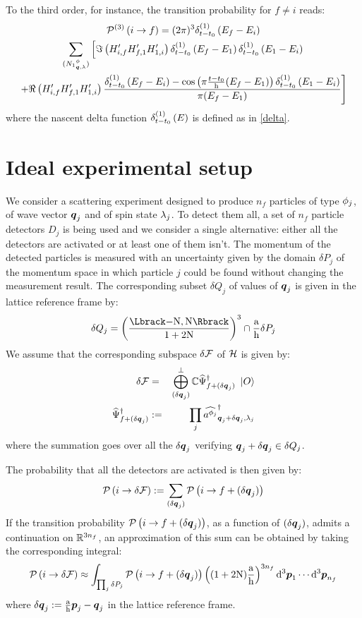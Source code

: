 \documentclass[10pt,a4paper,twoside,openany]{book}
\begin{document}
To the third order, for instance, the transition probability for $f \neq i$ reads:
\begin{multline*}
\TPn i f 3 = ( 2 \pi )^3 \deltaE1{E_f - E_i} \\
\sum_{\bFQ {N_1} \pt \q \sp} \left[ \Im \left( H'_{i,f} H'_{f,1} H'_{1,i} \right ) \deltaE1{E_f - E_1} \deltaE1{E_1 - E_i} \right. \\
\left. + \Re \left( H'_{i,f} H'_{f,1} H'_{1,i} \right ) \frac{\deltaE1{E_f - E_i} - \cos{\pi \frac{t - t_0} \h ( E_f - E_1 )} \deltaE1{E_1 - E_i}}{\pi ( E_f - E_1 )} \right]
\end{multline*}
where the nascent delta function $\deltaE1{E}$ is defined as in \ref{delta}.

\section{Ideal experimental setup}

We consider a scattering experiment designed to produce $n_f$ particles of type $\pt_j$, of wave vector $\q_j$ and of spin state $\sp_j$. To detect them all, a set of $n_f$ particle detectors $D_j$ is being used and we consider a single alternative: either all the detectors are activated or at least one of them isn't. The momentum of the detected particles is measured with an uncertainty given by the domain $\delta P_j$ of the momentum space in which particle $j$ could be found without changing the measurement result. The corresponding subset $\delta Q_j$ of values of $\q_j$ is given in the lattice reference frame by:
\begin{equation*}
\delta Q_j = \FLD \cap \frac \a \h \delta P_j
\end{equation*}
We assume that the corresponding subspace $\delta \F$ of $\H$ is given by:
\begin{eqnarray*}
\delta \F & = & \bigoplus_{(\delta \q_j)}^{\perp} \IC \dop{\Psi}_{f + (\delta \q_j)} \ket{O} \\
\dop{\Psi}_{f + (\delta \q_j)} & \eqdef & \prod_j \cop {\pt_j} {\q_j + \delta \q_j} {\sp_j}
\end{eqnarray*}
where the summation goes over all the $\delta \q_j$ verifying $\q_j + \delta \q_j \in \delta Q_j$.

The probability that all the detectors are activated is then given by:
\begin{equation*}
\TP i {\delta \F} \eqdef \sum_{(\delta \q_j)} \TP i {f + (\delta \q_j)}
\end{equation*}
If the transition probability $\TP i {f + (\delta \q_j)}$, as a function of $(\delta \q_j)$, admits a continuation on $\IR^{3 n_f}$, an approximation of this sum can be obtained by taking the corresponding integral:
\begin{equation*}
\TP i {\delta \F} \approx \int_{\prod_j \delta P_j} \TP i {f + (\delta \q_j)} \left( (1 + 2 \N) \frac \a \h \right)^{3 n_f} \dtp_1 \dotsm \dtp_{n_f}
\end{equation*}
where $\delta \q_j \eqdef \frac \a \h \p_j - \q_j$ in the lattice reference frame.
\end{document}
